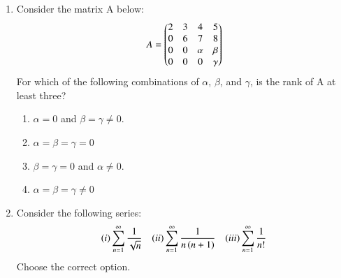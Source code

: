 \documentclass[journal,12pt,onecolumn]{IEEEtran}
\theoremstyle{remark}
\begin{document}
\begin{enumerate}
\hfill{}

\begin{enumerate}
\end{enumerate}

\item Consider the matrix A below:
\[ A=\begin{pmatrix}2&3&4&5\\ 0&6&7&8\\ 0&0&\alpha&\beta\\ 0&0&0&\gamma\end{pmatrix} \]
For which of the following combinations of $\alpha$, $\beta$, and $\gamma$, is the rank of A at least three? 
\begin{enumerate}[label=(\roman*)]
    \item $\alpha=0$ and $\beta=\gamma\ne0$.
    \item $\alpha=\beta=\gamma=0$
    \item $\beta=\gamma=0$ and $\alpha\ne0$.
    \item $\alpha=\beta=\gamma\ne0$
\end{enumerate}


\hfill{}

\begin{enumerate}
\end{enumerate}

\item Consider the following series: 
\begin{align*}
    (i) \sum_{n=1}^{\infty} \frac{1}{\sqrt{n}} \quad (ii) \sum_{n=1}^{\infty} \frac{1}{n\left(n+1\right)} \quad (iii) \sum_{n=1}^{\infty} \frac{1}{n!}
\end{align*}
Choose the correct option.

\hfill{}

\begin{enumerate}
\end{enumerate}


\end{enumerate}
\end{document}
